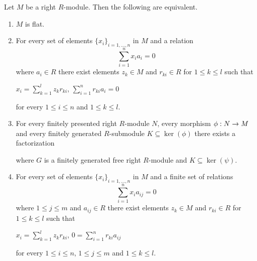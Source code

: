 \begin{theorem}\label{theorem:equationalcriteria}
Let $M$ be a right $R$-module. Then the following are equivalent.
\begin{enumerate}[label=\emph{\textbf{(\roman*)}}, leftmargin=1.5em]
\item $M$ is flat.
\item For every set of elements $\{x_i\}_{i=1,...,n}$ in $M$ and a relation
$$\sum^n_{i=1}x_ia_{i}=0$$
where $a_{i}\in R$ there exist elements $z_k\in M$ and $r_{ki}\in R$ for $1\leq k\leq l$ such that
\begin{center}
$x_i=\sum^l_{k=1}z_kr_{ki}$, $\sum^n_{i=1}r_{ki}a_{i}=0$
\end{center}
for every $1\leq i \leq n$ and $1\leq k\leq l$.
\item For every finitely presented right $R$-module $N$, every morphism $\phi:N\rightarrow M$ and every finitely generated $R$-submodule $K\subseteq \ker(\phi)$ there exists a factorization
\begin{center}
\end{center}
where $G$ is a finitely generated free right $R$-module and $K\subseteq \ker(\psi)$.
\item For every set of elements $\{x_i\}_{i=1,...,n}$ in $M$ and a finite set of relations
$$\sum^n_{i=1}x_ia_{ij}=0$$
where $1\leq j\leq m$ and $a_{ij}\in R$ there exist elements $z_k\in M$ and $r_{ki}\in R$ for $1\leq k\leq l$ such that
\begin{center}
$x_i=\sum^l_{k=1}z_kr_{ki}$, $0=\sum^n_{i=1}r_{ki}a_{ij}$
\end{center}
for every $1\leq i \leq n$, $1\leq j\leq m$ and $1\leq k\leq l$.
\end{enumerate}
\end{theorem}
